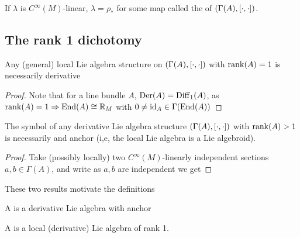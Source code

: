 \documentclass{article}
\begin{document}
\begin{definition}
If $\lambda$ is $C^\infty(M)$-linear, $\lambda = \rho_\ast$ for some map
called the  of $(\Gamma(A), \left[ \cdot, \cdot \right])$. 
\end{definition}

\subsection{The rank 1 dichotomy}

\begin{prop}
Any (general) local Lie algebra structure on $(\Gamma(A), \left[ \cdot, \cdot \right])$ with $\operatorname{rank}(A)=1$ is necessarily derivative 
\end{prop}
\begin{proof}
Note that for a line bundle $A$, $\operatorname{Der}(A) = \operatorname{Diff}_1(A)$, as $\operatorname{rank}(A)=1 \Rightarrow \operatorname{End}(A) \cong \mathbb{R}_M$ with $0 \neq \operatorname{id}_A \in \Gamma(\operatorname{End}(A))$
\end{proof}

\begin{prop}
The symbol of any derivative Lie algebra structure $(\Gamma(A), \left[ \cdot, \cdot \right])$ with $\operatorname{rank}(A) >1$ is necessarily and anchor (i,e, the local Lie algebra is a Lie algebroid).
\end{prop}
\begin{proof}
Take (possibly locally) two $C^\infty(M)$-linearly independent sections $a,b \in \Gamma(A)$, and write 
as $a,b$ are independent we get 
\end{proof}

These two results motivate the definitions

\begin{definition}
A  is a derivative Lie algebra with anchor
\end{definition}

\begin{definition}
A  is a local (derivative) Lie algebra of rank 1. 
\end{definition}
\end{document}
